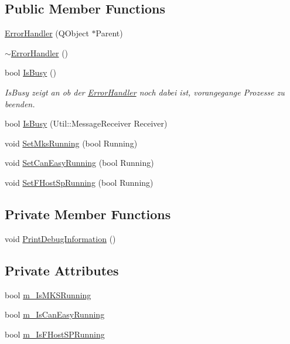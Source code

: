 \subsection*{Public Member Functions}
\begin{DoxyCompactItemize}
\item 
\hyperlink{class_r_w_1_1_c_o_r_e_1_1_error_handler_a094d83179b751152eb56cecb5548ff47}{Error\+Handler} (Q\+Object $\ast$Parent)
\item 
\hyperlink{class_r_w_1_1_c_o_r_e_1_1_error_handler_a600852f08871a018da65f523ace50bc2}{$\sim$\+Error\+Handler} ()
\item 
bool \hyperlink{class_r_w_1_1_c_o_r_e_1_1_error_handler_a63b57c30d5d7b4b2ce7c0b65ee64e627}{Is\+Busy} ()
\begin{DoxyCompactList}\small\item\em Is\+Busy zeigt an ob der \hyperlink{class_r_w_1_1_c_o_r_e_1_1_error_handler}{Error\+Handler} noch dabei ist, vorangegange Prozesse zu beenden. \end{DoxyCompactList}\item 
bool \hyperlink{class_r_w_1_1_c_o_r_e_1_1_error_handler_a43a98f148cdb6b07775e2e44a631b411}{Is\+Busy} (Util\+::\+Message\+Receiver Receiver)
\item 
void \hyperlink{class_r_w_1_1_c_o_r_e_1_1_error_handler_a1045b5b8cfce6f8476c4c61b6c797509}{Set\+Mks\+Running} (bool Running)
\item 
void \hyperlink{class_r_w_1_1_c_o_r_e_1_1_error_handler_ae068accee78e011ae187df1e05b7c9e6}{Set\+Can\+Easy\+Running} (bool Running)
\item 
void \hyperlink{class_r_w_1_1_c_o_r_e_1_1_error_handler_a838abbf533ba65c7f51266507e9d256a}{Set\+F\+Host\+Sp\+Running} (bool Running)
\end{DoxyCompactItemize}
\subsection*{Private Member Functions}
\begin{DoxyCompactItemize}
\item 
void \hyperlink{class_r_w_1_1_c_o_r_e_1_1_error_handler_a7356ddc63cc1accf1e81c7a8ebb62187}{Print\+Debug\+Information} ()
\end{DoxyCompactItemize}
\subsection*{Private Attributes}
\begin{DoxyCompactItemize}
\item 
bool \hyperlink{class_r_w_1_1_c_o_r_e_1_1_error_handler_acd15489cf612e45395d48c6054579380}{m\+\_\+\+Is\+M\+K\+S\+Running}
\item 
bool \hyperlink{class_r_w_1_1_c_o_r_e_1_1_error_handler_a430b5c523f3b9fc33d49ff3c0c440db4}{m\+\_\+\+Is\+Can\+Easy\+Running}
\item 
bool \hyperlink{class_r_w_1_1_c_o_r_e_1_1_error_handler_afbf39dd927a052468bbf9792981e73c1}{m\+\_\+\+Is\+F\+Host\+S\+P\+Running}
\end{DoxyCompactItemize}


